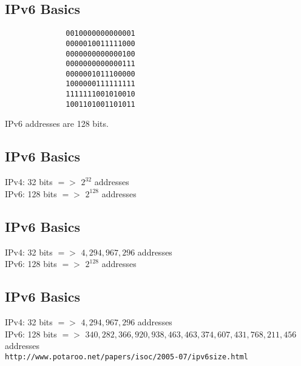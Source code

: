 \documentclass[xga]{xdvislides}
\begin{document}
\subsection{IPv6 Basics}
\Hugesize
\begin{center}
\begin{verbatim}
              0010000000000001
              0000010011111000
              0000000000000100
              0000000000000111
              0000001011100000
              1000000111111111
              1111111001010010
              1001101001101011
\end{verbatim}
\vspace{.5in}
IPv6 addresses are 128 bits.
\end{center}
\Normalsize

\subsection{IPv6 Basics}
\Hugesize
\begin{center}
IPv4: 32 bits $=>$ $2^{32}$ addresses \\
\vspace{.5in}
IPv6: 128 bits $=>$ $2^{128}$ addresses
\end{center}
\Normalsize

\subsection{IPv6 Basics}
\Hugesize
\begin{center}
IPv4: 32 bits $=>$ $4,294,967,296$ addresses \\
\vspace{.5in}
IPv6: 128 bits $=>$ $2^{128}$ addresses
\end{center}
\Normalsize

\subsection{IPv6 Basics}
\Hugesize
\begin{center}
IPv4: 32 bits $=>$ $4,294,967,296$ addresses \\
\vspace{.5in}
IPv6: 128 bits $=>$ $340,282,366,920,938,463,463,374,607,431,768,211,456$ addresses \\
\vspace{.5in}
\verb+http://www.potaroo.net/papers/isoc/2005-07/ipv6size.html+
\end{center}
\Normalsize
\end{document}
